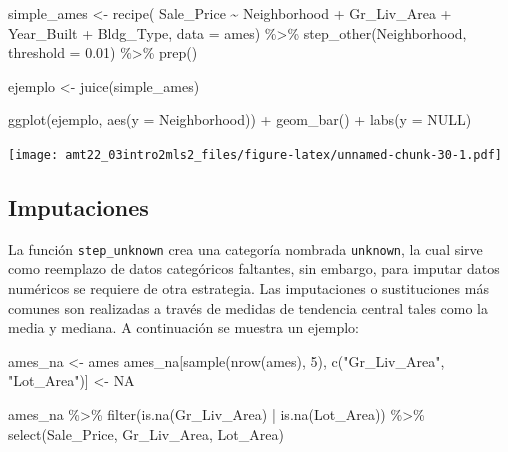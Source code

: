 \documentclass[
]{book}
\newenvironment{Shaded}{\begin{snugshade}}{\end{snugshade}}
\newcommand{\AttributeTok}[1]{\textcolor[rgb]{0.77,0.63,0.00}{#1}}
\newcommand{\ConstantTok}[1]{\textcolor[rgb]{0.00,0.00,0.00}{#1}}
\newcommand{\DecValTok}[1]{\textcolor[rgb]{0.00,0.00,0.81}{#1}}
\newcommand{\FloatTok}[1]{\textcolor[rgb]{0.00,0.00,0.81}{#1}}
\newcommand{\FunctionTok}[1]{\textcolor[rgb]{0.00,0.00,0.00}{#1}}
\newcommand{\NormalTok}[1]{#1}
\newcommand{\OtherTok}[1]{\textcolor[rgb]{0.56,0.35,0.01}{#1}}
\newcommand{\SpecialCharTok}[1]{\textcolor[rgb]{0.00,0.00,0.00}{#1}}
\newcommand{\StringTok}[1]{\textcolor[rgb]{0.31,0.60,0.02}{#1}}
\begin{document}
\begin{Shaded}
\begin{Highlighting}[]
\NormalTok{simple\_ames }\OtherTok{\textless{}{-}} \FunctionTok{recipe}\NormalTok{(}
\NormalTok{  Sale\_Price }\SpecialCharTok{\textasciitilde{}}\NormalTok{ Neighborhood }\SpecialCharTok{+}\NormalTok{ Gr\_Liv\_Area }\SpecialCharTok{+}\NormalTok{ Year\_Built }\SpecialCharTok{+}\NormalTok{ Bldg\_Type,}
  \AttributeTok{data =}\NormalTok{ ames) }\SpecialCharTok{\%\textgreater{}\%}
  \FunctionTok{step\_other}\NormalTok{(Neighborhood, }\AttributeTok{threshold =} \FloatTok{0.01}\NormalTok{) }\SpecialCharTok{\%\textgreater{}\%} 
  \FunctionTok{prep}\NormalTok{()}

\NormalTok{ejemplo }\OtherTok{\textless{}{-}} \FunctionTok{juice}\NormalTok{(simple\_ames)}

\FunctionTok{ggplot}\NormalTok{(ejemplo, }\FunctionTok{aes}\NormalTok{(}\AttributeTok{y =}\NormalTok{ Neighborhood)) }\SpecialCharTok{+} 
  \FunctionTok{geom\_bar}\NormalTok{() }\SpecialCharTok{+} 
  \FunctionTok{labs}\NormalTok{(}\AttributeTok{y =} \ConstantTok{NULL}\NormalTok{)}
\end{Highlighting}
\end{Shaded}

\texttt{[image: amt22\_03intro2mls2\_files/figure-latex/unnamed-chunk-30-1.pdf]}

\hypertarget{imputaciones}{%
\subsection{Imputaciones}\label{imputaciones}}

La función \texttt{step\_unknown} crea una categoría nombrada \texttt{unknown}, la cual sirve como reemplazo de datos categóricos faltantes, sin embargo, para imputar datos numéricos se requiere de otra estrategia. Las imputaciones o sustituciones más comunes son realizadas a través de medidas de tendencia central tales como la media y mediana. A continuación se muestra un ejemplo:

\begin{Shaded}
\begin{Highlighting}[]
\NormalTok{ames\_na }\OtherTok{\textless{}{-}}\NormalTok{ ames}
\NormalTok{ames\_na[}\FunctionTok{sample}\NormalTok{(}\FunctionTok{nrow}\NormalTok{(ames), }\DecValTok{5}\NormalTok{), }\FunctionTok{c}\NormalTok{(}\StringTok{"Gr\_Liv\_Area"}\NormalTok{, }\StringTok{"Lot\_Area"}\NormalTok{)] }\OtherTok{\textless{}{-}} \ConstantTok{NA}

\NormalTok{ames\_na }\SpecialCharTok{\%\textgreater{}\%} \FunctionTok{filter}\NormalTok{(}\FunctionTok{is.na}\NormalTok{(Gr\_Liv\_Area) }\SpecialCharTok{|} \FunctionTok{is.na}\NormalTok{(Lot\_Area)) }\SpecialCharTok{\%\textgreater{}\%} 
  \FunctionTok{select}\NormalTok{(Sale\_Price, Gr\_Liv\_Area, Lot\_Area)}
\end{Highlighting}
\end{Shaded}
\end{document}
